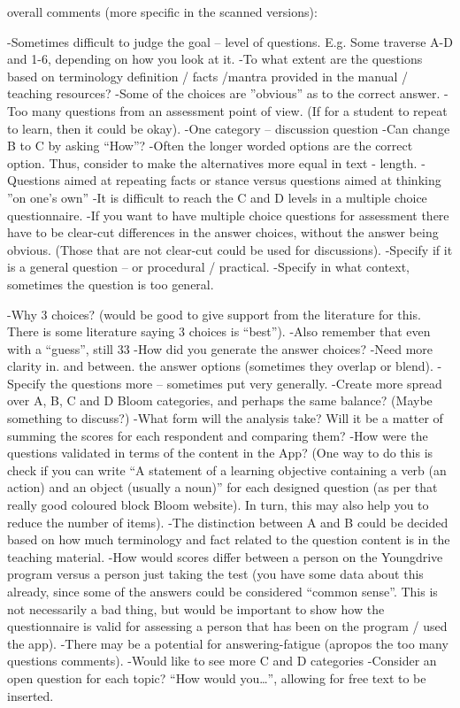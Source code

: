 overall comments (more specific in the scanned versions):

-Sometimes difficult to judge the goal – level of questions. E.g. Some traverse A-D and 1-6, depending on how you look at it.
-To what extent are the questions based on terminology definition / facts /mantra provided in the manual / teaching resources?
-Some of the choices are ”obvious” as to the correct answer.
-Too many questions from an assessment point of view. (If for a student to repeat to learn, then it could be okay).
-One category – discussion question
-Can change B to C by asking “How”?
-Often the longer worded options are the correct option. Thus, consider to make the alternatives more equal in text - length.
-Questions aimed at repeating facts or stance versus questions aimed at thinking ”on one’s own”
-It is difficult to reach the C and D levels in a multiple choice questionnaire.
-If you want to have multiple choice questions for assessment there have to be clear-cut differences in the answer choices, without the answer being obvious. (Those that are not clear-cut could be used for discussions).
-Specify if it is a general question – or procedural / practical.
-Specify in what context, sometimes the question is too general.

-Why 3 choices? (would be good to give support from the literature for this. There is some literature saying 3 choices is “best”).
-Also remember that even with a “guess”, still 33%
-How did you generate the answer choices?
-Need more clarity in. and between. the answer options (sometimes they overlap or blend).
-Specify the questions more – sometimes put very generally.
-Create more spread over A, B, C and D Bloom categories, and perhaps the same balance? (Maybe something to discuss?)
-What form will the analysis take? Will it be a matter of summing the scores for each respondent and comparing them?
-How were the questions validated in terms of the content in the App? (One way to do this is check if you can write “A statement of a learning objective containing a verb (an action) and an object (usually a noun)” for each designed question (as per that really good coloured block Bloom website). In turn, this may also help you to reduce the number of items).
-The distinction between A and B could be decided based on how much terminology and fact related to the question content is in the teaching material.
-How would scores differ between a person on the Youngdrive program versus a person just taking the test (you have some data about this already, since some of the answers could be considered “common sense”. This is not necessarily a bad thing, but would be important to show how the questionnaire is valid for assessing a person that has been on the program / used the app).
-There may be a potential for answering-fatigue (apropos the too many questions comments).
-Would like to see more C and D categories
-Consider an open question for each topic? “How would you…”, allowing for free text to be inserted.
